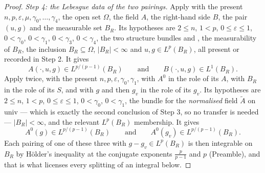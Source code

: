 \begin{proof}
\medskip
\noindent\emph{Step 4: the Lebesgue data of the two pairings.}  Apply
 with the present
$n,p,\varepsilon,\mu,\gamma_0,\dots,\gamma_4$, the open set $\Omega$, the field
$A$, the right-hand side $B$, the pair $(u,g)$ and the measurable set $B_R$.
Its hypotheses are $2\le n$, $1<p$, $0\le\varepsilon\le1$, $0<\gamma_0$,
$0<\gamma_1$, $0<\gamma_3$, $0<\gamma_4$, the two structure bundles
 and , the
measurability of $B_R$, the inclusion $B_R\subseteq\Omega$, $|B_R|<\infty$ and
$u,g\in L^p(B_R)$, all present or recorded in Step 2.  It gives
\[
A(\cdot,u,g)\in L^{p/(p-1)}(B_R)
\qquad\text{and}\qquad
B(\cdot,u,g)\in L^1(B_R).
\]
Apply  twice, with the present
$n,p,\varepsilon,\gamma_0,\gamma_1$, with $A^0$ in the role of its $A$, with
$B_R$ in the role of its $S$, and with $g$ and then $g_v$ in the role of its
$g_v$.  Its hypotheses are $2\le n$, $1<p$, $0\le\varepsilon\le1$, $0<\gamma_0$,
$0<\gamma_1$, the bundle for the \emph{normalised} field $\widetilde A$ on
$\mathrm{univ}$ --- which is exactly the second conclusion of Step 3, so no
transfer is needed --- $|B_R|<\infty$, and the relevant $L^p(B_R)$ membership.
It gives
\[
A^0(g)\in L^{p/(p-1)}(B_R)
\qquad\text{and}\qquad
A^0(g_v)\in L^{p/(p-1)}(B_R).
\]
Each pairing of one of these three with $g-g_v\in L^p(B_R)$ is then integrable
on $B_R$ by H\"older's inequality at the conjugate exponents $\frac p{p-1}$ and
$p$ (Preamble), and that is what licenses every splitting of an integral below.


\end{proof}
